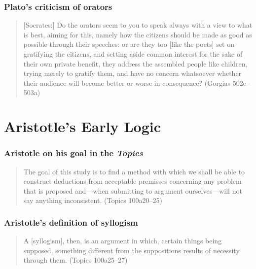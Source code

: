 \documentclass[compress,12pt]{beamer}
\begin{document}
\begin{frame}
    \frametitle{Plato's criticism of orators}
    \begin{quote}
        [Socrates:] Do the orators seem to you to speak always with a view to what is best, aiming for this, namely how the citizens should be made as good as possible through their speeches: or are they too [like the poets] set on gratifying the citizens, and setting aside common interest for the sake of their own private benefit, they address the assembled people like children, trying merely to gratify them, and have no concern whatsoever whether their audience will become better or worse in consequence? (\textup{Gorgias} 502e--503a)
    \end{quote}
\end{frame}

\section{Aristotle's Early Logic}

\begin{frame}
      \frametitle{Aristotle on his goal in the \emph{Topics}}
      \begin{quote}
          The goal of this study is to find a method with which we shall be able to construct deductions from acceptable premisses concerning any problem that is proposed and---when submitting to argument ourselves---will not say anything inconsistent. (\textup{Topics} 100a20--25)
      \end{quote}
\end{frame}

\begin{frame}
      \frametitle{Aristotle's definition of syllogism}
      \begin{quote}
          A \textup{[syllogism]}, then, is an argument in which, certain things being supposed, something different from the suppositions results of necessity through them. (\textup{Topics} 100a25--27)
      \end{quote}
\end{frame}
\end{document}
